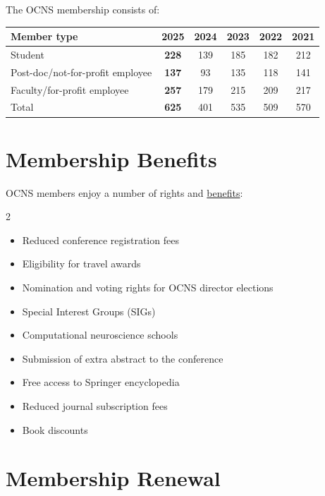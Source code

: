 \documentclass[11pt,a4paper,oneside]{article}
\begin{document}
The OCNS membership consists of:
\begin{table}[!h]
  \centering
  \begin{tabularx}{0.7\textwidth}{X|ccccc}
    \textbf{Member type}& \textbf{2025} & \textbf{2024} & \textbf{2023} & \textbf{2022} & \textbf{2021} \\
    \toprule{}
    Student & \textbf{228} & 139 &  185 & 182 & 212 \\
    Post-doc/not-for-profit employee & \textbf{137} & 93 & 135 & 118 & 141 \\
    Faculty/for-profit employee & \textbf{257} & 179 & 215 & 209 & 217 \\
    \midrule{}
    Total & \textbf{625} & 401 & 535 & 509 & 570 \\
  \end{tabularx}
\end{table}

\section*{Membership Benefits}%
\sectionauthor{\vspace{-4ex}}

OCNS members enjoy a number of rights and \href{https://www.cnsorg.org/member-benefits}{benefits}:
\begin{multicols}{2}
  \begin{itemize}
    \item Reduced conference registration fees
    \item Eligibility for travel awards
    \item Nomination and voting rights for OCNS director elections
    \item Special Interest Groups (SIGs)
    \item Computational neuroscience schools
    \item Submission of extra abstract to the conference
    \item Free access to Springer encyclopedia
    \item Reduced journal subscription fees
    \item Book discounts
  \end{itemize}
\end{multicols}

\section*{Membership Renewal}%
\sectionauthor{\vspace{-4ex}}
\end{document}
